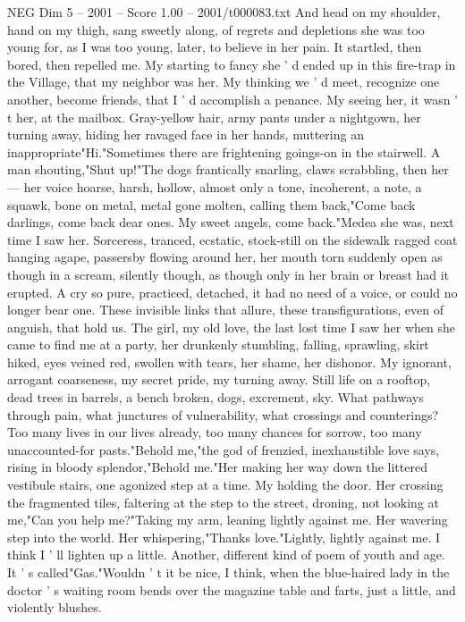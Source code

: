 \begin{textsample}{NEG Dim 5 – 2001 – Score 1.00 – 2001/t000083.txt}
And head on my shoulder, hand on my thigh, sang sweetly along, of regrets and depletions she was too young for, as I was too young, later, to believe in her pain.
It startled, then bored, then repelled me.
My starting to fancy she ' d ended up in this fire-trap in the Village, that my neighbor was her.
My thinking we ' d meet, recognize one another, become friends, that I ' d accomplish a penance.
My seeing her, it wasn ' t her, at the mailbox.
Gray-yellow hair, army pants under a nightgown, her turning away, hiding her ravaged face in her hands, muttering an inappropriate"Hi."Sometimes there are frightening goings-on in the stairwell.
A man shouting,"Shut up!"The dogs frantically snarling, claws scrabbling, then her — her voice hoarse, harsh, hollow, almost only a tone, incoherent, a note, a squawk, bone on metal, metal gone molten, calling them back,"Come back darlings, come back dear ones.
My sweet angels, come back."Medea she was, next time I saw her.
Sorceress, tranced, ecstatic, stock-still on the sidewalk ragged coat hanging agape, passersby flowing around her, her mouth torn suddenly open as though in a scream, silently though, as though only in her brain or breast had it erupted.
A cry so pure, practiced, detached, it had no need of a voice, or could no longer bear one.
These invisible links that allure, these transfigurations, even of anguish, that hold us.
The girl, my old love, the last lost time I saw her when she came to find me at a party, her drunkenly stumbling, falling, sprawling, skirt hiked, eyes veined red, swollen with tears, her shame, her dishonor.
My ignorant, arrogant coarseness, my secret pride, my turning away.
Still life on a rooftop, dead trees in barrels, a bench broken, dogs, excrement, sky.
What pathways through pain, what junctures of vulnerability, what crossings and counterings?
Too many lives in our lives already, too many chances for sorrow, too many unaccounted-for pasts."Behold me,"the god of frenzied, inexhaustible love says, rising in bloody splendor,"Behold me."Her making her way down the littered vestibule stairs, one agonized step at a time.
My holding the door.
Her crossing the fragmented tiles, faltering at the step to the street, droning, not looking at me,"Can you help me?"Taking my arm, leaning lightly against me.
Her wavering step into the world.
Her whispering,"Thanks love."Lightly, lightly against me.
I think I ' ll lighten up a little.
Another, different kind of poem of youth and age.
It ' s called"Gas."Wouldn ' t it be nice, I think, when the blue-haired lady in the doctor ' s waiting room bends over the magazine table and farts, just a little, and violently blushes.

\end{textsample}
